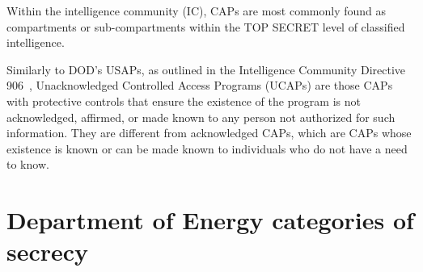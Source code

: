 Within the intelligence community (IC), CAPs are most commonly found as compartments or sub-compartments within the TOP SECRET level of classified intelligence.

Similarly to DOD's USAPs, as outlined in the Intelligence Community Directive 906~\cite{ICD906},
Unacknowledged Controlled Access Programs (UCAPs) are those CAPs
with protective controls that ensure the existence of the program is not acknowledged,
affirmed, or made known to any person not authorized for such information.
They are different from acknowledged CAPs,
which are CAPs whose existence is known or can be made known to individuals who
do not have a need to know.


\section{Department of Energy categories of secrecy}
\label{2023-UFO-part-Perception-crash-retreivals-DOECOS}


